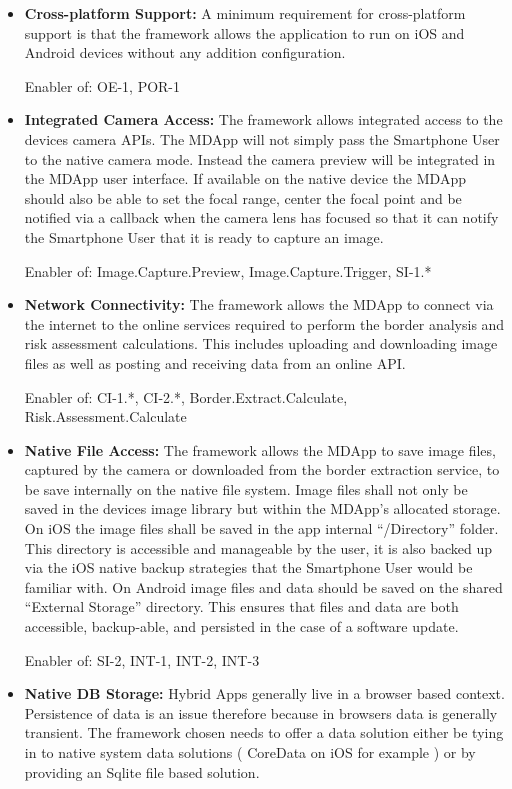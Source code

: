 \begin{itemize}[label={}]
\item \textbf{Cross-platform Support:} A minimum requirement for cross-platform support is that the framework allows the application to run on iOS and Android devices without any addition configuration.

Enabler of: OE-1, POR-1

\item \textbf{Integrated Camera Access:} The framework allows integrated access to the devices camera APIs. The MDApp will not simply pass the Smartphone User to the native camera mode. Instead the camera preview will be integrated in the MDApp user interface. If available on the native device the MDApp should also be able to set the focal range, center the focal point and be notified via a callback when the camera lens has focused so that it can notify the Smartphone User that it is ready to capture an image.

Enabler of: Image.Capture.Preview, Image.Capture.Trigger, SI-1.*

\item \textbf{Network Connectivity:} The framework allows the MDApp to connect via the internet to the online services required to perform the border analysis and risk assessment calculations. This includes uploading and downloading image files as well as posting and receiving data from an online API.

Enabler of: CI-1.*, CI-2.*, Border.Extract.Calculate, Risk.Assessment.Calculate

\item \textbf{Native File Access:} The framework allows the MDApp to save image files, captured by the camera or downloaded from the border extraction service, to be save internally on the native file system. Image files shall not only be saved in the devices image library but within the MDApp’s allocated storage. On iOS the image files shall be saved in the app internal “/Directory” folder. This directory is accessible and manageable by the user, it is also backed up via the iOS native backup strategies that the Smartphone User would be familiar with. On Android image files and data should be saved on the shared “External Storage” directory. This ensures that files and data are both accessible, backup-able, and persisted in the case of a software update.

Enabler of: SI-2, INT-1, INT-2, INT-3

\item \textbf{Native DB Storage:} Hybrid Apps generally live in a browser based context. Persistence of data is an issue therefore because in browsers data is generally transient. The framework chosen needs to offer a data solution either be tying in to native system data solutions ( CoreData on iOS for example ) or by providing an Sqlite file based solution.


\end{itemize}
